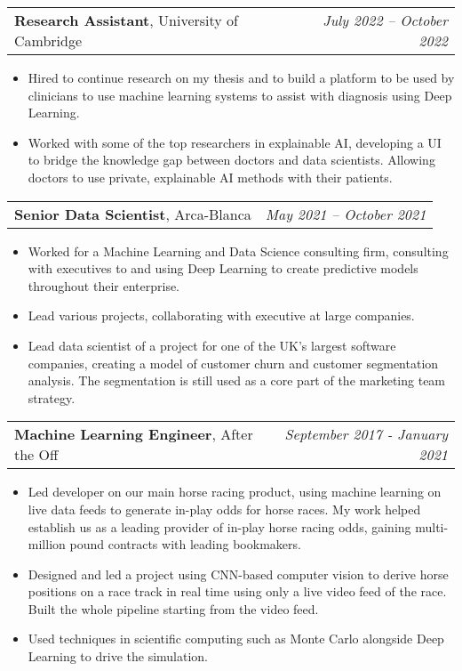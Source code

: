 \documentclass[letterpaper,11pt]{article}
\makeatletter
\newcommand{\CVItem}[1]{
  \item{
    {#1 \vspace{0pt}}
  }
}
\newcommand{\CVSubHeading}[4]{
  \vspace{4pt}\item
    \begin{tabular*}{0.99\textwidth}[t]{l@{\extracolsep{\fill}}r}
      \textbf{#1}, {#3} & \textit{#4} \\
    \end{tabular*}\vspace{-3pt}
}
\newcommand{\CVItemListStart}{\begin{itemize}}
\newcommand{\CVItemListEnd}{\end{itemize}\vspace{-3pt}}
\makeatother
\begin{document}
    \CVSubHeading{Research Assistant}{}{University of Cambridge}{July 2022 – October 2022}
        \CVItemListStart
            \CVItem{
                Hired to continue research on my thesis and to build a platform to be used by clinicians to use machine learning systems to assist with diagnosis using Deep Learning.
            }
            \CVItem{
                Worked with some of the top researchers in explainable AI, developing a UI to bridge the knowledge gap between doctors and data scientists. Allowing doctors to use private, explainable AI methods with their patients.
            }
        \CVItemListEnd

    \CVSubHeading{Senior Data Scientist}{}{Arca-Blanca}{May 2021 – October 2021}
        \CVItemListStart
            \CVItem{
                Worked for a Machine Learning and Data Science consulting firm, consulting with executives to and using Deep Learning to create predictive models throughout their enterprise.
            }
            \CVItem{
                Lead various projects, collaborating with executive at large companies.
            }
            \CVItem{
                Lead data scientist of a project for one of the UK's largest software companies, creating a model of customer churn and customer segmentation analysis. The segmentation is still used as a core part of the marketing team strategy. 
            }
        \CVItemListEnd

    \CVSubHeading{Machine Learning Engineer}{}{After the Off}{September 2017 - January 2021}
        \CVItemListStart
            \CVItem{
                Led developer on our main horse racing product, using machine learning on live data feeds to generate in-play odds for horse races. My work helped establish us as a leading provider of in-play horse racing odds, gaining multi-million pound contracts with leading bookmakers.
            }
            \CVItem{
                Designed and led a project using CNN-based computer vision to derive horse positions on a race track in real time using only a live video feed of the race. Built the whole pipeline starting from the video feed.
            }
            \CVItem{
                Used techniques in scientific computing such as Monte Carlo alongside Deep Learning to drive the simulation.
            }
        \CVItemListEnd
\end{document}
